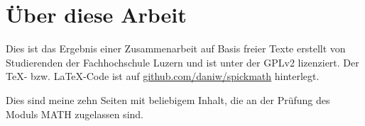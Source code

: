 



\section*{Über diese Arbeit}
Dies ist das Ergebnis einer Zusammenarbeit auf Basis freier Texte erstellt von Studierenden der Fachhochschule Luzern und ist unter der GPLv2 lizenziert. Der \TeX - bzw. \LaTeX -Code ist auf \url{github.com/daniw/spickmath} hinterlegt. 

Dies sind meine zehn Seiten mit beliebigem Inhalt, die an der Prüfung des Moduls MATH zugelassen sind. 



